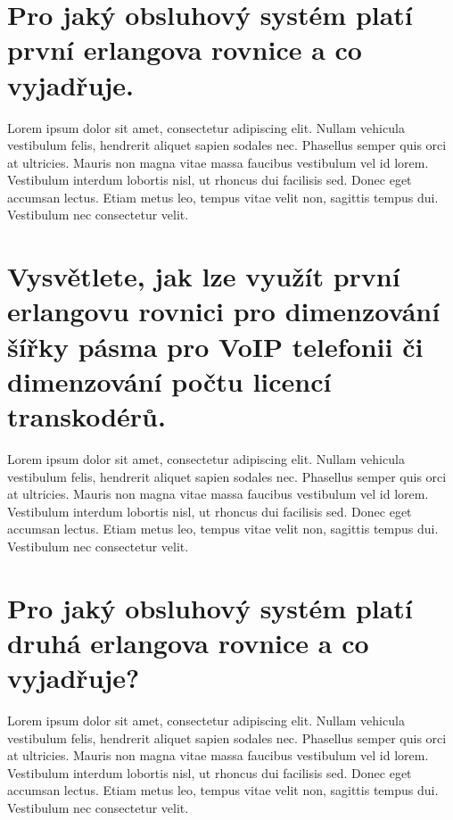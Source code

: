 \section{Pro jaký obsluhový systém platí první erlangova rovnice a co vyjadřuje.}

Lorem ipsum dolor sit amet, consectetur adipiscing elit. Nullam vehicula vestibulum felis, hendrerit aliquet sapien sodales nec. Phasellus semper quis orci at ultricies. Mauris non magna vitae massa faucibus vestibulum vel id lorem. Vestibulum interdum lobortis nisl, ut rhoncus dui facilisis sed. Donec eget accumsan lectus. Etiam metus leo, tempus vitae velit non, sagittis tempus dui. Vestibulum nec consectetur velit.

\section{Vysvětlete, jak lze využít první erlangovu rovnici pro dimenzování šířky pásma pro VoIP telefonii či dimenzování počtu licencí transkodérů.}

Lorem ipsum dolor sit amet, consectetur adipiscing elit. Nullam vehicula vestibulum felis, hendrerit aliquet sapien sodales nec. Phasellus semper quis orci at ultricies. Mauris non magna vitae massa faucibus vestibulum vel id lorem. Vestibulum interdum lobortis nisl, ut rhoncus dui facilisis sed. Donec eget accumsan lectus. Etiam metus leo, tempus vitae velit non, sagittis tempus dui. Vestibulum nec consectetur velit.

\section{Pro jaký obsluhový systém platí druhá erlangova rovnice a co vyjadřuje?}

Lorem ipsum dolor sit amet, consectetur adipiscing elit. Nullam vehicula vestibulum felis, hendrerit aliquet sapien sodales nec. Phasellus semper quis orci at ultricies. Mauris non magna vitae massa faucibus vestibulum vel id lorem. Vestibulum interdum lobortis nisl, ut rhoncus dui facilisis sed. Donec eget accumsan lectus. Etiam metus leo, tempus vitae velit non, sagittis tempus dui. Vestibulum nec consectetur velit.